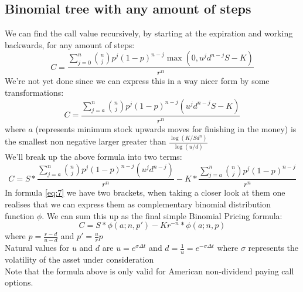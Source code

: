 \documentclass{article}
\begin{document}
\subsection{Binomial tree with any amount of steps}
We can find the call value recursively, by starting at the expiration and working backwards, for any amount of steps:
\begin{equation}\label{eq:5}
    C = \frac{\sum_{j=0}^{n} {n \choose j} p^{j}(1-p)^{n-j}\max(0, u^{j}d^{n-j}S - K)}{r^{n}}
\end{equation}
We’re not yet done since we can express this in a way nicer form by some transformations:
\begin{equation}\label{eq:6}
    C = \frac{\sum_{j=a}^{n} {n \choose j} p^{j}(1-p)^{n-j} (u^{j}d^{n-j}S - K)}{r^{n}}
\end{equation}
where $a$ (represents minimum stock upwards moves for finishing in the money) is the smallest non negative larger greater than $\frac{\log(K / S d^{n})}{\log(u / d)} $ \\
We'll break up the above formula into two terms:
\begin{equation}\label{eq:7}
    C = S *\frac{\sum_{j=a}^{n} {n \choose j} p^{j}(1-p)^{n-j} (u^{j}d^{n-j})}{r^{n}} - K * \frac{\sum_{j=a}^{n} {n \choose j} p^{j}(1-p)^{n-j}}{r^{n}}
\end{equation}
In formula \ref{eq:7} we have two brackets, when taking a closer look at them one realises that we can express them as complementary binomial distribution function $\phi$. We can sum this up as the final simple Binomial Pricing formula:
\begin{equation}\label{eq:8}
    C = S *\phi(a; n, p') - K r^{-n} * \phi(a; n, p)
\end{equation}
where $p=\frac{r-d}{u-d}$ and $p'=\frac{u}{r}p$\\ [2ex]
Natural values for $u$ and $d$ are $u = e^{\sigma \Delta t}$ and $d=\frac{1}{u}=e^{-\sigma \Delta t}$ where $\sigma$ represents the volatility of the asset under consideration \\ [2ex]
Note that the formula above is only valid for American non-dividend paying call options.
\end{document}
